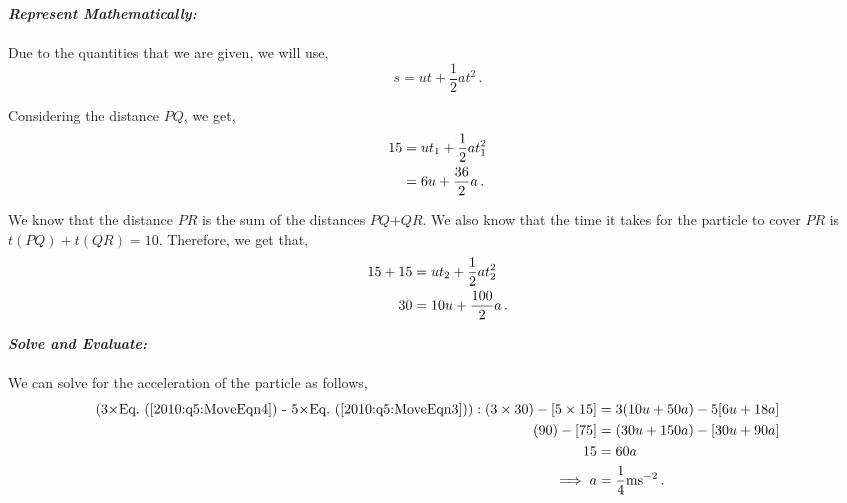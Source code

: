 \begin{subquestions}
\begin{subsubquestions}
\textbf{\textit{Represent Mathematically:}} \\ \\
Due to the quantities that we are given, we will use,
\begin{equation}
	s = ut + \frac{1}{2}at^2 \,.
\end{equation}

Considering the distance $PQ$, we get,
\begin{align}
	15 & = ut_1 + \frac{1}{2}at_1^2 \nonumber \\
	& = 6u + \frac{36}{2}a \,. \label{2010:q5:MoveEqn3}
\end{align}

We know that the distance $PR$ is the sum of the distances $PQ$+$QR$. We also know that the time it takes for the particle to cover $PR$ is $t(PQ)+t(QR)=10$. Therefore, we get that,
\begin{align}
	15+15 & = ut_2 + \frac{1}{2}at_2^2 \nonumber \\
	30 & = 10u + \frac{100}{2}a \,. \label{2010:q5:MoveEqn4}
\end{align}




\textbf{\textit{Solve and Evaluate:}} \\ \\
We can solve for the acceleration of the particle as follows,
\begin{align}
	(\text{3$\times$\req{2010:q5:MoveEqn4} - 5$\times$\req{2010:q5:MoveEqn3}}): (3 \times 30) - [5 \times 15] & = 3(10u+50a) - 5[6u+18a] \nn \\
                                                                                                    (90)-[75] & = (30u+150a)-[30u+90a] \nn \\
                                                                                                           15 & = 60a \nn \\
                                                                                                           \implies a & = \frac{1}{4}\text{ms}^{-2} \,.
\end{align}



\end{subsubquestions}
\end{subquestions}
